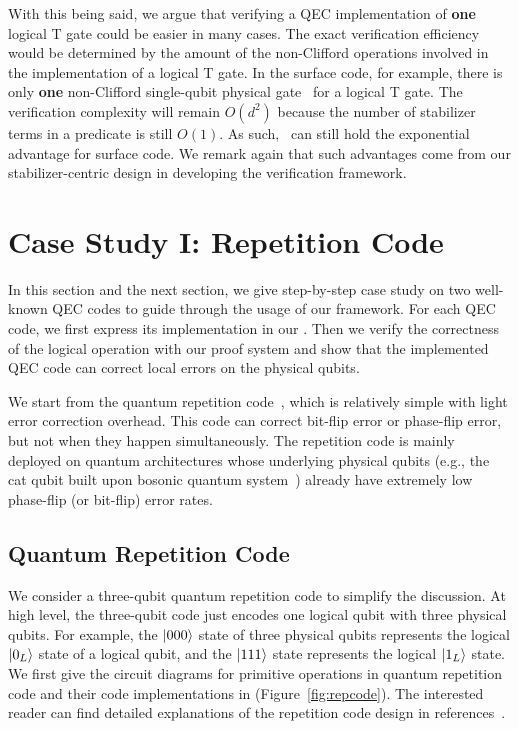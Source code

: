With this being said, we argue that verifying a QEC implementation of \textbf{one} logical T gate could be easier in many cases. The exact verification efficiency would be determined by the amount of the non-Clifford operations involved in the implementation of a logical T gate.
In the surface code, for example, there is only \textbf{one} non-Clifford single-qubit physical  gate~\cite{Fowler2015MinimumWP} for a logical T gate. 
The verification complexity will remain $O(d^2)$ because the number of stabilizer terms in a predicate is still $O(1)$. As such, \myFrameworkName~can still hold the exponential advantage for surface code. We remark again that such advantages come from our stabilizer-centric design in developing the verification framework. 


\section{Case Study I: Repetition Code}
In this section and the next section, we give step-by-step case study on two well-known QEC codes to guide through the usage of our framework. 
For each QEC code, we first express its implementation in our {\langname}. %
Then we verify the correctness of the logical operation with our proof system and show that the implemented QEC code can correct local errors on the physical qubits.

We start from the quantum repetition code~\cite{nielsen2002quantum}, which is relatively simple with light error correction overhead. 
This code can correct bit-flip error or phase-flip error, but not when they happen simultaneously. 
The repetition code is mainly deployed on quantum architectures whose underlying physical qubits (e.g., the cat qubit built upon bosonic quantum system~\cite{Chamberland2020BuildingAF}) already have extremely low phase-flip (or bit-flip) error rates. %

\subsection{Quantum Repetition Code}
We consider a three-qubit quantum repetition code to simplify the discussion. At high level, the three-qubit code just encodes one logical qubit with three physical qubits. For example, the $\vert 000 \rangle$ state of three physical qubits represents the logical $\vert 0_L \rangle$ state of a logical qubit, and the $\vert 111 \rangle$ state represents the logical $\vert 1_L \rangle$ state. 
We first give the circuit diagrams for  primitive operations in quantum repetition code and their code implementations in {\langname} (Figure~\ref{fig:repcode}). 
The interested reader can find detailed explanations of the repetition code design in references~\cite{nielsen2002quantum, google50296}. 


